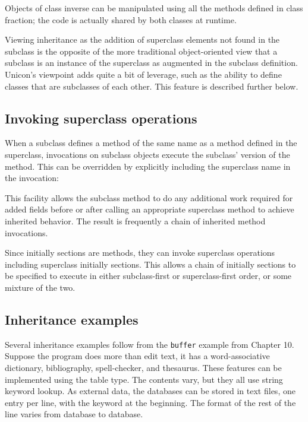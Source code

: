 
Objects of class inverse can be manipulated using all the methods
defined in class fraction; the code is actually shared by both classes
at runtime. 

Viewing inheritance as the addition of superclass elements not found in
the subclass is the opposite of the more traditional object-oriented
view that a subclass is an instance of the
superclass as augmented in the subclass definition.
Unicon's viewpoint adds quite a bit of leverage, such
as the ability to define classes that are subclasses of each other.
This feature is described further below. 

\subsection*{Invoking superclass operations}

When a subclass defines a
method of the same name as a method defined in the superclass,
invocations on subclass objects execute the
subclass' version of the
method. This can be overridden by explicitly
including the superclass name in the invocation:


This facility allows the subclass method to do any additional work
required for added fields before or after calling an appropriate
superclass method to achieve inherited behavior. The result is
frequently a chain of inherited method invocations. 

Since initially sections are methods, they can invoke superclass
operations including superclass initially sections. This allows a chain
of initially sections to be specified to execute in either
subclass-first or superclass-first order, or some mixture of the two. 

\subsection*{Inheritance examples}

Several inheritance examples follow from the \texttt{buffer}
example from Chapter 10. Suppose the program does more than
edit text, it has a word-associative
dictionary, bibliography, spell-checker, and thesaurus. These
features can be implemented using the table type.
The contents vary, but they all use string
keyword lookup. As external data, the databases can be stored in text
files, one entry per line, with the keyword at the beginning. The
format of the rest of the line varies from database to database.

